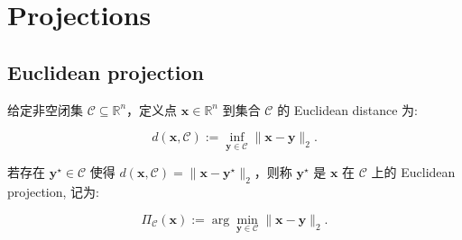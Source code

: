 \section{Projections}

\subsection{Euclidean projection}


\begin{defblock}
给定非空闭集 $\mathcal{C} \subseteq \mathbb{R}^n$，定义点 $\bm{x} \in \mathbb{R}^n$ 到集合 $\mathcal{C}$ 的 Euclidean distance 为:

\[
d(\bm{x}, \mathcal{C}) := \inf_{\bm{y} \in \mathcal{C}} \|\bm{x}-\bm{y}\|_2.
\]

若存在 $\bm{y}^\star \in \mathcal{C}$ 使得 $d(\bm{x}, \mathcal{C}) = \|\bm{x}-\bm{y}^\star\|_2$，则称 $\bm{y}^\star$ 是 $\bm{x}$ 在 $\mathcal{C}$ 上的 Euclidean projection, 记为:

\[
\Pi_{\mathcal{C}}(\bm{x}) := \arg\min_{\bm{y} \in \mathcal{C}} \|\bm{x}-\bm{y}\|_2.
\]

\end{defblock}


